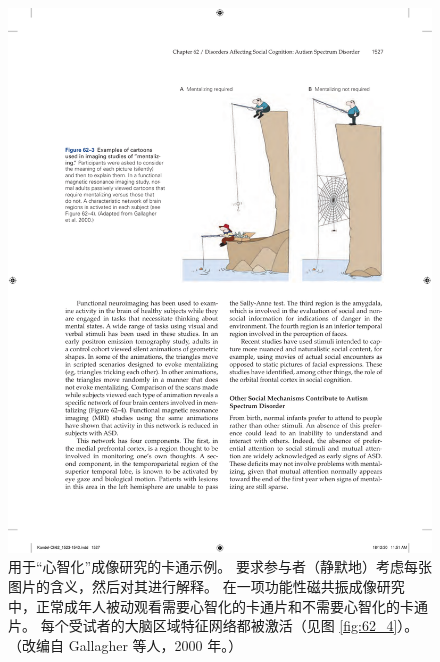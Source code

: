 \begin{figure}[htbp]
	\centering
	\includegraphics[width=0.7\linewidth]{chap62/fig_62_3}
	\caption{用于“心智化”成像研究的卡通示例。 要求参与者（静默地）考虑每张图片的含义，然后对其进行解释。 在一项功能性磁共振成像研究中，正常成年人被动观看需要心智化的卡通片和不需要心智化的卡通片。 每个受试者的大脑区域特征网络都被激活（见图 \ref{fig:62_4}）。 （改编自 Gallagher 等人，2000 年。）}
	\label{fig:62_3}
\end{figure}


